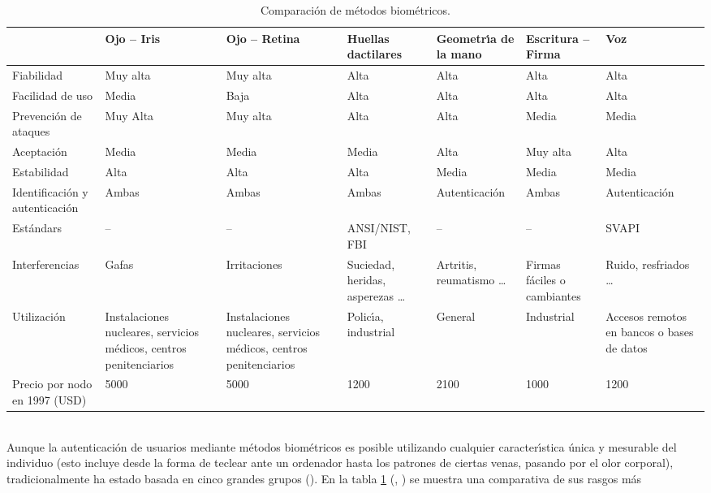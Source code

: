 \begin{table}
\begin{center}
\begin{tabular}{|p{0.75in}||p{0.75in}|p{0.75in}|p{0.70in}|p{0.85in}|p{0.65in}|p{0.85in}|}
\hline
& Ojo -- Iris & Ojo -- Retina & Huellas dactilares & Geometr\'{\i}a de la mano & Escritura -- Firma & Voz\\
\hline\hline
Fiabilidad & Muy alta & Muy alta & Alta & Alta & Alta & Alta\\ 
\hline
Facilidad de uso & Media & Baja & Alta & Alta & Alta & Alta\\
\hline
Prevenci\'on de ataques & Muy Alta & Muy alta & Alta & Alta & Media & Media\\
\hline
Aceptaci\'on & Media & Media & Media & Alta & Muy alta & Alta\\
\hline
Estabilidad & Alta & Alta & Alta & Media & Media & Media\\
\hline
Identificaci\'on y autenticaci\'on & Ambas & Ambas & Ambas & Autenticaci\'on & Ambas & Autenticaci\'on\\
\hline
Est\'andars & -- & -- & ANSI/NIST, FBI & -- & -- & SVAPI\\
\hline
Interferencias & Gafas & Irritaciones & Suciedad, heridas, asperezas \ldots & Artritis, reumatismo \ldots & Firmas f\'aciles o cambiantes & Ruido, resfriados \ldots\\
\hline
Utilizaci\'on & Instalaciones nucleares, servicios m\'edicos, centros penitenciarios & Instalaciones nucleares, servicios m\'edicos, centros penitenciarios & Polic\'{\i}a, industrial & General & Industrial & Accesos remotos en bancos o bases de datos\\
\hline 
Precio por nodo en 1997 (USD) & 5000 & 5000 & 1200 & 2100 & 1000 & 1200\\
\hline
\end{tabular}
\end{center}
\caption{Comparaci\'on de m\'etodos biom\'etricos.}
\label{biocomp}
\end{table}
\\Aunque la autenticaci\'on de usuarios mediante m\'etodos biom\'etricos es
posible utilizando cualquier caracter\'{\i}stica \'unica y mesurable del 
individuo (esto incluye desde la forma de teclear ante un ordenador hasta 
los patrones de ciertas venas, pasando por el olor corporal), tradicionalmente 
ha estado basada en cinco grandes grupos (\cite{kn:eve92}). En la tabla 
\ref{biocomp} (\cite{kn:huo98}, \cite{kn:phi97}) se muestra una comparativa de 
sus rasgos m\'as
